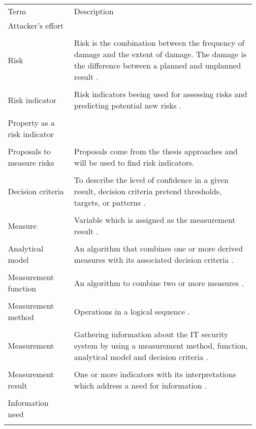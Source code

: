 \newpage

\begin{center}
  \begin{tabular}{ |L{4cm}|L{10cm}|  }
    \hline
     Term & Description \\ [0.5ex]
    Attacker's effort & \\
    & \\
    \hline
    Risk & Risk is the combination between the frequency of damage and
    the extent of damage. The damage is the difference between a
    planned and unplanned result \cite{bsi_glossar_2021}. \\
    & \\
    \hline
    Risk indicator & Risk indicators beeing used for assessing risks
    and predicting potential new risks \cite{Saluja2014RiskIF}. \\
    & \\
    \hline
    Property as a risk indicator & \\
    & \\
    \hline
    Proposals to measure risks & Proposals come from the thesis approaches and will be used to find risk indicators. \\
    & \\
    \hline
    Decision criteria & To describe the level of confidence in a given result, decision criteria pretend thresholds, targets, or patterns \cite{ISO_27004_2009}. \\
    & \\
    \hline
    Measure & Variable which is assigned as the measurement result \cite{ISO_27004_2009}. \\
    & \\
    \hline
    Analytical model & An algorithm that combines one or more derived measures with its associated decision criteria \cite{ISO_27004_2009}. \\
    & \\
    \hline
    Measurement function & An algorithm to combine two or more measures \cite{ISO_27004_2009}. \\
    & \\
    \hline
    Measurement method & Operations in a logical sequence \cite{ISO_27004_2009}. \\
    & \\
    \hline
    Measurement & Gathering information about the IT security system by using a measurement method, function, analytical model and decision criteria \cite{ISO_27004_2009}. \\
    & \\
    \hline
    Measurement result & One or more indicators with its interpretations which address a need for information \cite{ISO_27004_2009}. \\
    & \\
    \hline
    Information need & \\
    & \\
    \hline
  \end{tabular}
\end{center}

